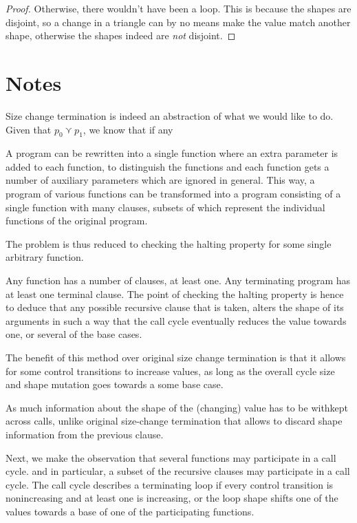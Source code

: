 \begin{proof} Otherwise, there wouldn't have been a loop. This is because the
shapes are disjoint, so a change in a triangle can by no means make the value
match another shape, otherwise the shapes indeed are \emph{not} disjoint.
\end{proof}





\newpage

\section{Notes}

Size change termination is indeed an abstraction of what we would like to do.
Given that $p_0\curlyvee p_1$, we know that if any 


A program can be rewritten into a single function where an extra parameter is
added to each function, to distinguish the functions and each function gets a
number of auxiliary parameters which are ignored in general. This way, a
program of various functions can be transformed into a program consisting of a
single function with many clauses, subsets of which represent the individual
functions of the original program.

The problem is thus reduced to checking the halting property for some single
arbitrary function.

Any function has a number of clauses, at least one. Any terminating program has
at least one terminal clause. The point of checking the halting property is
hence to deduce that any possible recursive clause that is taken, alters the
shape of its arguments in such a way that the call cycle eventually reduces the
value towards one, or several of the base cases.

The benefit of this method over original size change termination is that it
allows for some control transitions to increase values, as long as the overall
cycle size and shape mutation goes towards a some base case.

As much information about the shape of the (changing) value has to be withkept
across calls, unlike original size-change termination that allows to discard
shape information from the previous clause.

Next, we make the observation that several functions may participate in a call
cycle.  and in particular, a subset of the recursive clauses may participate in
a call cycle. The call cycle describes a terminating loop if every control
transition is nonincreasing and at least one is increasing, or the loop shape
shifts one of the values towards a base of one of the participating functions.

